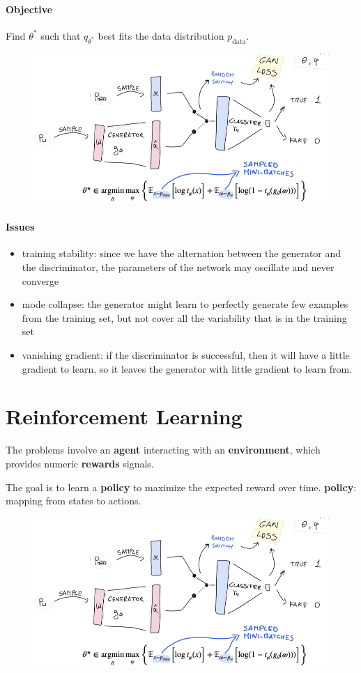 \documentclass[a4paper,6pt,twocolumn,fleqn]{article}
\begin{document}
\paragraph{Objective}
Find \(\theta^*\) such that \(q_{\theta^*}\) best fits the data distribution \(p_\text{data}\).

\begin{figure}[h!]
    \centering
    \includegraphics[width=.4\textwidth]{101}
    \label{fig:101}
\end{figure}

\paragraph{Issues}
\begin{itemize}
    \item training stability: since we have the alternation between the generator and the discriminator, the parameters of the network may oscillate and never converge
    \item mode collapse: the generator might learn to perfectly generate few examples from the training set, but not cover all the variability that is in the training set
    \item vanishing gradient: if the discriminator is successful, then it will have a little gradient to learn, so it leaves the generator with little gradient to learn from.
\end{itemize}

\section{Reinforcement Learning}
The problems involve an \textbf{agent} interacting with an \textbf{environment}, which provides numeric \textbf{rewards} signals.

The goal is to learn a \textbf{policy} to maximize the expected reward over time.
\textbf{policy}: mapping from states to actions.

\begin{figure}[h!]
    \centering
    \includegraphics[width=.4\textwidth]{101}
    \label{fig:090}
\end{figure}
\end{document}
